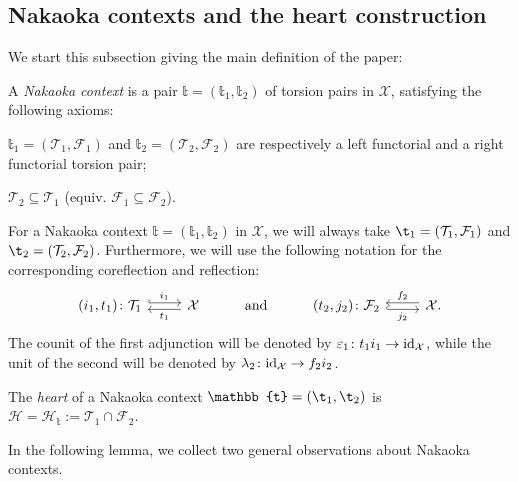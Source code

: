 \subsection{Nakaoka contexts and the heart construction}

We start this subsection giving the main definition of the paper:

\begin{definition}
A \emph{Nakaoka context} is a pair $\mathbb{t}=(\mathbb{t}_1,\mathbb{t}_2)$ of torsion pairs in $\mathcal{X}$, satisfying the following axioms:
\begin{torsionaxioms}
\item\label{ax:ct1} $\mathbb{t}_1=(\mathcal{T}_1,\mathcal{F}_1)$ and $\mathbb{t}_2=(\mathcal{T}_2,\mathcal{F}_2)$ are respectively a left functorial and a right functorial torsion pair;
\item\label{ax:ct2} $\mathcal{T}_2\subseteq \mathcal{T}_1$ (equiv. $\mathcal{F}_1\subseteq\mathcal{F}_2$).
\end{torsionaxioms}
\end {definition}


\begin{notation}
For a Nakaoka context $\mathbb{t}=(\mathbb{t}_1,\mathbb{t}_2)$ in $\mathcal{X}$, we will always take $\t_1=(\T_1,\F_1)$ and $\t_2=(\T_2,\F_2)$. Furthermore, we will use the following notation for the corresponding coreflection and reflection:
\begin{equation*}
\begin{tikzcd}
(i_1,t_1)\colon\mathcal{T}_1\arrow[hook, shift left]{r}{i_1}
& \mathcal{X}\arrow[shift left]{l}{t_1}
& \mathrm{and}
& (t_2,j_2)\colon\mathcal{F}_2\arrow[hook, shift right]{r}[']{j_2}
& \mathcal{X}\arrow[shift right]{l}[']{f_2}.
\end{tikzcd}
\end{equation*}
The counit of the first adjunction will be denoted by $\varepsilon_{1}\colon t_1i_1\to \mathrm{id}_\mathcal X$, while the unit of the second will be denoted by  $\lambda_{2}\colon \mathrm{id}_\mathcal X \to f_2i_2$.
\end{notation}
 
 
\begin{definition}
The {\em heart} of a Nakaoka context $\mathbb{t}=(\t_1,\t_2)$ is $\mathcal{H}=\mathcal{H}_\mathbb{t}:=\mathcal{T}_1\cap\mathcal{F}_2$. 
\end{definition}

In the following lemma, we collect two general observations about Nakaoka contexts.

